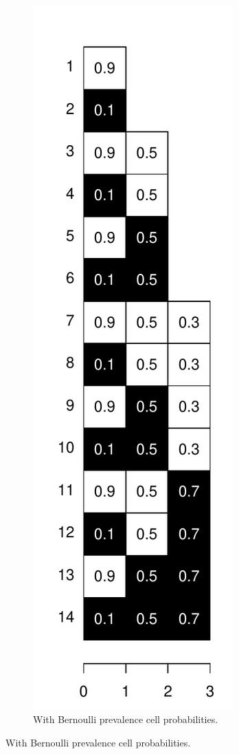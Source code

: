 \documentclass{bmcart}
\begin{document}
\begin{figure}
\begin{subfigure}[b]{0.4\textwidth}
        \label{fig:b1}
    \end{subfigure}
    ~ 
    \begin{subfigure}[b]{0.4\textwidth}
        \includegraphics[scale=.5]{Figures/BernTrajProbs.pdf}
        \caption{With Bernoulli prevalence cell probabilities.}
        \label{fig:b2}
    \end{subfigure}
    

\end{figure}
\end{document}
